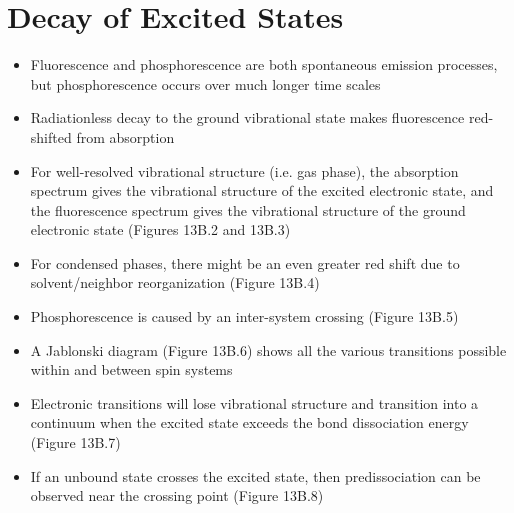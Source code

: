 \documentclass[12pt, openany, letterpaper]{memoir}
\begin{document}
\section{Decay of Excited States}
\begin{itemize}
	\item Fluorescence and phosphorescence are both spontaneous emission processes, but phosphorescence occurs over much longer time scales	
	\item Radiationless decay to the ground vibrational state makes fluorescence red-shifted from absorption
	\item For well-resolved vibrational structure (i.e. gas phase), the absorption spectrum gives the vibrational structure of the excited electronic state, and the fluorescence spectrum gives the vibrational structure of the ground electronic state (Figures 13B.2 and 13B.3)
	\item For condensed phases, there might be an even greater red shift due to solvent/neighbor reorganization (Figure 13B.4)
	\item Phosphorescence is caused by an inter-system crossing (Figure 13B.5)
	\item A Jablonski diagram (Figure 13B.6) shows all the various transitions possible within and between spin systems
	\item Electronic transitions will lose vibrational structure and transition into a continuum when the excited state exceeds the bond dissociation energy (Figure 13B.7)
	\item If an unbound state crosses the excited state, then predissociation can be observed near the crossing point (Figure 13B.8)
\end{itemize}
\end{document}
